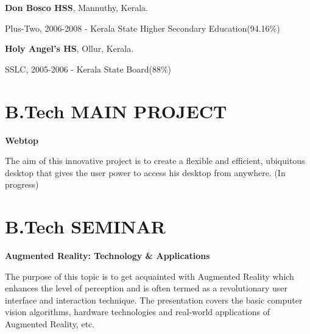 \begin{resume}
{\bf \textsf{Don Bosco HSS}}, Mannuthy, Kerala.\\
\vspace*{-.1in}
\begin{list1}
\item[] Plus-Two, 2006-2008 - Kerala State Higher Secondary Education\qquad \qquad(94.16\%)
\end{list1}

{\bf \textsf{Holy Angel's HS}}, Ollur, Kerala.\\
\vspace*{-.1in}
\begin{list1}
\item[] SSLC, 2005-2006 - Kerala State Board\qquad \qquad \qquad(88\%)
\end{list1}

\vspace*{+3.5mm} 

\section{\sc \bf \textsf{B.Tech MAIN PROJECT}}
{\bf \textsf{Webtop}}\\
\vspace*{-.1in}

\begin{list1}
\item[] The aim of this innovative project is to create a flexible and efficient, ubiquitous desktop that gives the user power to access his desktop from anywhere. \qquad (In progress)
\end{list1}

\vspace*{+3.5mm}

\section{\sc \bf \textsf{B.Tech \qquad SEMINAR}}
{\bf \textsf{Augmented Reality: Technology \& Applications}}\\
\vspace*{-.1in}

\begin{list1}
\item[] The purpose of this topic is to get acquainted with Augmented Reality which enhances the level of perception and is often termed as a revolutionary user interface and interaction technique. The presentation covers the basic computer vision algorithms, hardware technologies and real-world applications of Augmented Reality, etc.
\end{list1}


\end{resume}
